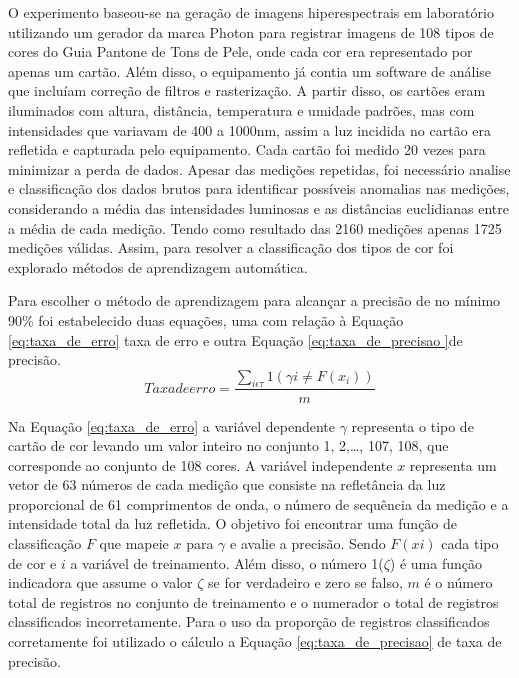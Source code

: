 O experimento baseou-se na geração de imagens hiperespectrais em laboratório utilizando um gerador da marca Photon para registrar imagens de 108 tipos de cores do Guia Pantone de Tons de Pele, onde cada cor era representado por apenas um cartão. Além disso, o equipamento já contia um software de análise que incluíam correção de filtros e rasterização.  A partir disso, os cartões eram iluminados com altura, distância, temperatura e umidade padrões, mas com intensidades que variavam de 400 a 1000nm, assim a luz incidida no cartão era refletida e capturada pelo equipamento. Cada cartão foi medido 20 vezes para minimizar a perda de dados. Apesar das medições repetidas, foi necessário analise e classificação  dos dados brutos para identificar possíveis anomalias nas medições, considerando a média das intensidades luminosas e as distâncias euclidianas entre a média de cada medição. Tendo como resultado das 2160 medições apenas 1725 medições válidas. Assim, para resolver a classificação dos tipos de cor foi explorado métodos de aprendizagem automática.

Para escolher o método de aprendizagem para alcançar a precisão de no mínimo 90\% foi estabelecido duas equações, uma com relação à Equação \ref{eq:taxa_de_erro} taxa de erro e outra Equação \ref{eq:taxa_de_precisao }de precisão.
\begin{equation}
\label{eq:taxa_de_erro}
Taxa de erro = \dfrac{\sum _{i\epsilon \tau} 1(\gamma i \neq F(x_{i}))}{m}
\end{equation}

Na Equação \ref{eq:taxa_de_erro} a variável dependente $\gamma$  representa o tipo de cartão de cor levando um valor inteiro no conjunto {1, 2,…, 107, 108}, que corresponde ao conjunto de 108 cores. A variável independente $x$ representa um vetor de 63 números de cada medição que consiste na refletância da luz proporcional de 61 comprimentos de onda, o número de sequência da medição e a intensidade total da luz refletida. O objetivo foi encontrar uma função de classificação $F$ que mapeie $x$ para $\gamma$ e avalie a precisão. Sendo $F(xi)$ cada tipo de cor e $i$ a variável de treinamento. Além disso, o número 1($\zeta$) é uma função indicadora que assume o valor $\zeta$ se for verdadeiro e zero se falso, $m$ é o número total de registros no conjunto de treinamento e o numerador o total de registros classificados incorretamente.
Para o uso da proporção de registros classificados corretamente foi utilizado o cálculo a Equação \ref{eq:taxa_de_precisao} de taxa de precisão.

